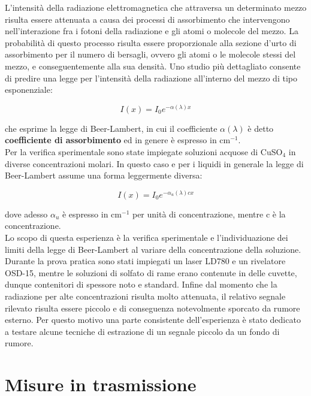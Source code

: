 \documentclass[10pt,letterpaper]{article}
\begin{document}
L'intensità della radiazione elettromagnetica che attraversa un determinato mezzo risulta essere attenuata a causa dei processi di assorbimento  che intervengono nell'interazione fra i fotoni della radiazione e gli atomi o molecole del mezzo. La probabilità di questo processo risulta essere proporzionale alla sezione d'urto di assorbimento per il numero di bersagli, ovvero gli atomi o le molecole stessi del mezzo, e conseguentemente alla sua densità. Uno studio più dettagliato consente di predire una legge per l'intensità della radiazione all'interno del mezzo di tipo esponenziale:

\begin{equation}
I(x) = I_0 e^{-\alpha (\lambda) x}
\end{equation}

che esprime la legge di Beer-Lambert, in cui il coefficiente $\alpha(\lambda)$ è detto \textbf{coefficiente di assorbimento} ed in genere è espresso in cm$^{-1}$.\\
Per la verifica sperimentale sono state impiegate soluzioni acquose di CuSO$_4$ in diverse concentrazioni molari. In questo caso e per i liquidi in generale la legge di Beer-Lambert assume una forma leggermente diversa:

\begin{equation}
I(x) = I_0 e^{-\alpha _u(\lambda) cx}
\end{equation}

dove adesso $\alpha _u$ è espresso in cm$^{-1}$ per unità di concentrazione, mentre c è la concentrazione.\\
Lo scopo di questa esperienza è la verifica sperimentale e l'individuazione dei limiti della legge di Beer-Lambert al variare della concentrazione della soluzione. Durante la prova pratica sono stati impiegati un laser LD780
e un rivelatore OSD-15, mentre le soluzioni di solfato di rame erano contenute in delle cuvette, dunque contenitori di spessore noto e standard. Infine dal momento che la radiazione per alte concentrazioni risulta molto attenuata, il relativo segnale rilevato risulta essere piccolo e di conseguenza notevolmente sporcato da rumore esterno. Per questo motivo una parte consistente dell'esperienza è stato dedicato a testare alcune tecniche di estrazione di un segnale piccolo da un fondo di rumore.

\section{Misure in trasmissione}
\end{document}
